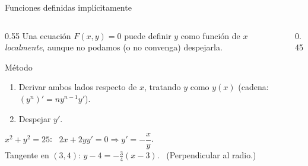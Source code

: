 \documentclass[10pt,aspectratio=169]{beamer}
\begin{document}
\begin{frame}{Funciones definidas implícitamente}
  \begin{columns}
    \begin{column}{0.55\textwidth}
      Una ecuación $F(x,y)=0$ puede definir $y$ como función de $x$ \emph{localmente}, aunque no podamos (o no convenga) despejarla.
      \begin{block}{Método}
        \begin{enumerate}
          \item Derivar ambos lados respecto de $x$, tratando $y$ como $y(x)$ (cadena: $(y^n)'=ny^{n-1}y'$).
          \item Despejar $y'$.
        \end{enumerate}
      \end{block}
      \begin{ejemplo}[10: circunferencia]
        $x^2+y^2=25$: \ $2x+2yy'=0\Rightarrow y'=-\dfrac xy$.\\
        Tangente en $(3,4)$: $y-4=-\frac34(x-3)$. \ (Perpendicular al radio.)
      \end{ejemplo}
    \end{column}
    \begin{column}{0.45\textwidth}
      \centering
    \end{column}
  \end{columns}
\end{frame}
\end{document}
